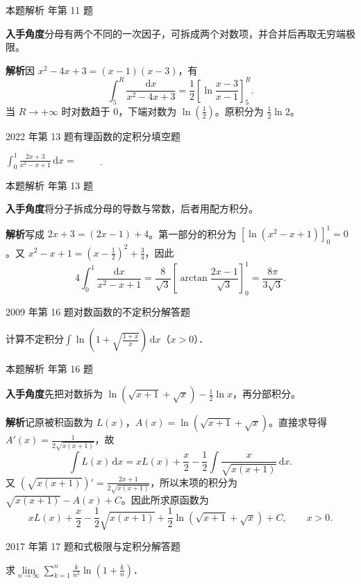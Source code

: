 \documentclass[UTF8,zihao=-4,fontset=fandol]{ctexart}
\renewcommand{\lim}{\operatorname*{lim}\limits}
\newcommand{\blank}{\underline{\hspace{5em}}}
\newcommand{\QuestionPage}[6]{%
  \par\noindent\begin{minipage}{\linewidth}
  \raggedright
  {\small\textcolor{black!60}{#3\quad #5}\hfill\textcolor{accent}{#2}}\par\smallskip}
\newcommand{\QuestionEnd}{\end{minipage}\par\medskip}
\newcommand{\QuestionPage}[6]{%
  \clearpage
  {\small\textcolor{accent}{#1\hfill #2}}\par\medskip
  {\small\textcolor{black!60}{#3\quad #5\hfill #6}}\par\vspace{9bp}}
\newcommand{\QuestionEnd}{}
\newenvironment{QuestionSolution}[1]{%
  \clearpage
  {\small\textcolor{black!60}{本题解析\quad #1}}\par\medskip
}{\par\clearpage}
\begin{document}
\begin{QuestionSolution}{2018 年第 11 题}
\textbf{入手角度}\quad 分母有两个不同的一次因子，可拆成两个对数项，并合并后再取无穷端极限。

\textbf{解析}\quad 因 \(x^2-4x+3=(x-1)(x-3)\)，有
\[
\int_5^R \frac{\mathrm{d}x}{x^2-4x+3}
=\frac12\left[\ln\frac{x-3}{x-1}\right]_5^R .
\]
当 \(R\to+\infty\) 时对数趋于 \(0\)，下端对数为 \(\ln(\frac{1}{2})\)。原积分为 \(\boxed{\tfrac12\ln2}\)。
\end{QuestionSolution}

\QuestionPage{3.3 两种基本积分法}{填空题}{2022 年第 13 题}{2}{有理函数的定积分}{158 / 234}
\(\int_{0}^{1} \frac{2x + 3}{x^{2} - x + 1} \,\mathrm{d}x = \blank{}\)
\QuestionEnd

\begin{QuestionSolution}{2022 年第 13 题}
\textbf{入手角度}\quad 将分子拆成分母的导数与常数，后者用配方积分。

\textbf{解析}\quad 写成 \(2x+3=(2x-1)+4\)。第一部分的积分为 \([\ln(x^2-x+1)]_0^1=0\)。又 \(x^2-x+1=(x-\frac{1}{2})^2+\frac{3}{4}\)，因此
\[
4\int_0^1\frac{\mathrm{d}x}{x^2-x+1}
=\frac8{\sqrt3}\left[\arctan\frac{2x-1}{\sqrt3}\right]_0^1
=\boxed{\frac{8\pi}{3\sqrt3}}.
\]
\end{QuestionSolution}

\QuestionPage{3.3 两种基本积分法}{解答题}{2009 年第 16 题}{3}{对数函数的不定积分}{159 / 234}
计算不定积分$\int \ln \left(1 + \sqrt{\frac{1 + x}{x}} \right)\,\mathrm{d} x$（$x > 0$）．
\QuestionEnd

\begin{QuestionSolution}{2009 年第 16 题}
\textbf{入手角度}\quad 先把对数拆为 \(\ln(\sqrt{x+1}+\sqrt{x})-\tfrac12\ln x\)，再分部积分。

\textbf{解析}\quad 记原被积函数为 \(L(x)\)，\(A(x)=\ln(\sqrt{x+1}+\sqrt{x})\)。直接求导得 \(A'(x)=\frac{1}{2\sqrt{x(x+1)}}\)，故
\[
\int L(x)\,\mathrm{d}x
=xL(x)+\frac{x}{2}-\frac12\int\frac{x}{\sqrt{x(x+1)}}\,\mathrm{d}x .
\]
又 \((\sqrt{x(x+1)})'=\frac{2x+1}{2\sqrt{x(x+1)}}\)，所以末项的积分为 \(\sqrt{x(x+1)}-A(x)+C\)。因此所求原函数为
\[
xL(x)+\frac{x}{2}-\frac12\sqrt{x(x+1)}
+\frac12\ln(\sqrt{x+1}+\sqrt{x})+C,\qquad x>0.
\]
\end{QuestionSolution}

\QuestionPage{3.3 两种基本积分法}{解答题}{2017 年第 17 题}{3}{和式极限与定积分}{160 / 234}
求$\lim_{n \to \infty} \sum_{k = 1}^n \frac{k}{n^2} \ln \left(1 + \frac{k}{n} \right)$．
\QuestionEnd
\end{document}
